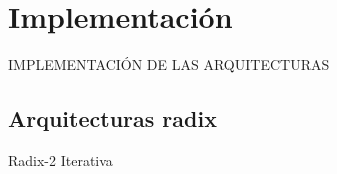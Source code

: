 \section{Implementación}

\begin{frame}
\begin{center}
\Huge IMPLEMENTACIÓN DE LAS ARQUITECTURAS
\end{center}
\end{frame}

\subsection{Arquitecturas radix}

\begin{frame}{Radix-2 Iterativa}
  \begin{columns}[T]
    

\end{columns}
\end{frame}
